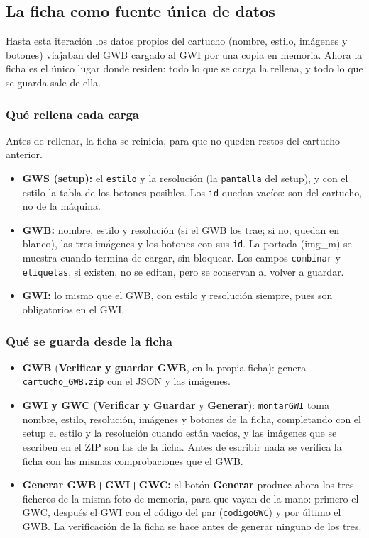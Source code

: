 \subsection{La ficha como fuente única de datos}
\label{sec:F5I10Fuente}

Hasta esta iteración los datos propios del cartucho (nombre, estilo, imágenes y botones) viajaban 
del GWB cargado al GWI por una copia en memoria. Ahora la ficha es el único lugar donde residen: 
todo lo que se carga la rellena, y todo lo que se guarda sale de ella.

\subsubsection{Qué rellena cada carga}
\label{sec:F5I10Carga}

Antes de rellenar, la ficha se reinicia, para que no queden restos del cartucho anterior.

\begin{itemize}
	\item \textbf{GWS (setup):} el \texttt{estilo} y la resolución (la \texttt{pantalla} del setup), y con el estilo la tabla de los botones posibles. Los \texttt{id} quedan vacíos: son del cartucho, no de la máquina.
	\item \textbf{GWB:} nombre, estilo y resolución (si el GWB los trae; si no, quedan en blanco), las tres imágenes y los botones con sus \texttt{id}. La portada (img\_m) se muestra cuando termina de cargar, sin bloquear. Los campos \texttt{combinar} y \texttt{etiquetas}, si existen, no se editan, pero se conservan al volver a guardar.
	\item \textbf{GWI:} lo mismo que el GWB, con estilo y resolución siempre, pues son obligatorios en el GWI.
\end{itemize}

\subsubsection{Qué se guarda desde la ficha}

\begin{itemize}
	\item \textbf{GWB} (\textbf{Verificar y guardar GWB}, en la propia ficha): genera \texttt{cartucho\_GWB.zip} con el JSON y las imágenes.
	
	\item \textbf{GWI y GWC} (\textbf{Verificar y Guardar} y \textbf{Generar}): \texttt{montarGWI} toma nombre, estilo, resolución, imágenes y botones de la ficha, completando con el setup el estilo y la resolución cuando están vacíos, y las imágenes que se escriben en el ZIP son las de la ficha. Antes de escribir nada se verifica la ficha con las mismas comprobaciones que el GWB.
	
	\item \textbf{Generar GWB+GWI+GWC:} el botón \textbf{Generar} produce ahora los tres ficheros de la misma foto de memoria, para que vayan de la mano: primero el GWC, después el GWI con el código del par (\texttt{codigoGWC}) y por último el GWB. La verificación de la ficha se hace antes de generar ninguno de los tres.
\end{itemize}

